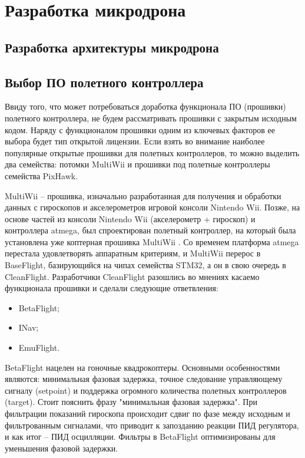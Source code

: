
\section{Разработка микродрона}
\subsection{Разработка архитектуры микродрона}
\subsection{Выбор ПО полетного контроллера}
Ввиду того, что может потребоваться доработка функционала ПО (прошивки) полетного контроллера, не будем рассматривать прошивки с закрытым исходным кодом. Наряду с функционалом прошивки одним из ключевых факторов ее выбора будет тип открытой лицензии. Если взять во внимание наиболее популярные открытые прошивки для полетных контроллеров, то можно выделить два семейства: потомки MultiWii и прошивки под полетные контроллеры семейства PixHawk.

MultiWii -- прошивка, изначально разработанная для получения и обработки данных с гироскопов и акселерометров игровой консоли Nintendo Wii. Позже, на основе частей из консоли Nintendo Wii (акселерометр + гироскоп) и контроллера atmega, был спроектирован полетный контроллер, на который была установлена уже коптерная прошивка MultiWii \cite{multiwii}. Со временем платформа atmega перестала удовлетворять аппаратным критериям, и MultiWii перерос в BaseFlight, базирующийся на чипах семейства STM32, а он в свою очередь в CleanFlight. Разработчики CleanFlight разошлись во мнениях касаемо функционала прошивки и сделали следующие ответвления:
\begin{itemize}
	\item BetaFlight;
	\item INav;
	\item EmuFlight.
\end{itemize}

BetaFlight нацелен на гоночные квадрокоптеры. Основными особенностями являются: минимальная фазовая задержка, точное следование управляющему сигналу (setpoint) и поддержка огромного количества полетных контроллеров (target).
Стоит пояснить фразу "минимальная фазовая задержка". При фильтрации показаний гироскопа происходит сдвиг по фазе между исходным и фильтрованным сигналами, что приводит к запозданию реакции ПИД регулятора, и как итог -- ПИД осцилляции. Фильтры в BetaFlight оптимизированы для уменьшения фазовой задержки.

